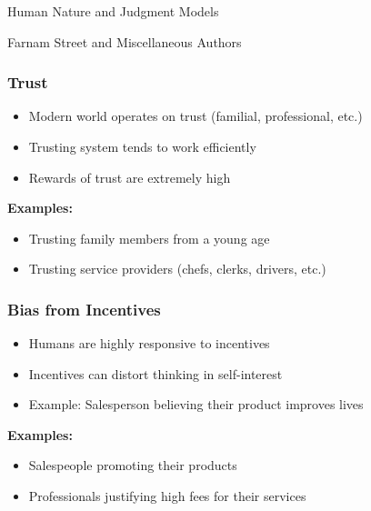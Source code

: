 \begin{frame}[fragile]\frametitle{}
\begin{center}
{\Large Human Nature and Judgment Models}

{\tiny Farnam Street and Miscellaneous Authors }


\end{center}
\end{frame}

\begin{frame}[fragile]\frametitle{Trust}
\begin{itemize}
    \item Modern world operates on trust (familial, professional, etc.)
    \item Trusting system tends to work efficiently
    \item Rewards of trust are extremely high
\end{itemize}
\textbf{Examples:}
\begin{itemize}
    \item Trusting family members from a young age
    \item Trusting service providers (chefs, clerks, drivers, etc.)
\end{itemize}
\end{frame}

\begin{frame}[fragile]\frametitle{Bias from Incentives}
\begin{itemize}
    \item Humans are highly responsive to incentives
    \item Incentives can distort thinking in self-interest
    \item Example: Salesperson believing their product improves lives
\end{itemize}
\textbf{Examples:}
\begin{itemize}
    \item Salespeople promoting their products
    \item Professionals justifying high fees for their services
\end{itemize}
\end{frame}

